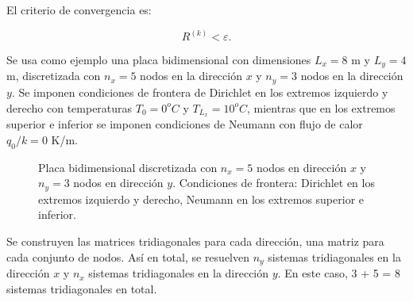 \documentclass[11pt,a4paper]{article}
\begin{document}
El criterio de convergencia es:

\begin{equation}
R^{(k)}<\varepsilon.
\end{equation}

Se usa como ejemplo una placa bidimensional con dimensiones $L_x=8$ m y 
$L_y=4$ m, discretizada con $n_x=5$ nodos en la direcci\'on $x$ y $n_y=3$ nodos 
en la direcci\'on $y$. Se imponen condiciones de frontera de Dirichlet en los
extremos izquierdo y derecho con temperaturas $T_0=0^{o}C$ y $T_{L_x}=10^{o}C$, 
mientras que en los extremos superior e inferior se imponen condiciones de 
Neumann con flujo de calor $q_0/k= 0$ K/m.

\begin{figure}[ht]
\centering
\captionsetup{justification=centering}
\caption{Placa bidimensional discretizada con $n_x=5$ nodos 
en dirección $x$ y $n_y=3$ nodos en dirección $y$. Condiciones de frontera: 
Dirichlet en los extremos izquierdo y derecho, Neumann en los extremos 
superior e inferior.}
\label{fig:placa_2d}
\end{figure}

Se construyen las matrices tridiagonales para cada direcci\'on, una 
matriz para cada conjunto de nodos. As\'i en total, se resuelven $n_y$ 
sistemas tridiagonales en la direcci\'on $x$ y $n_x$ sistemas tridiagonales en 
la direcci\'on $y$. En este caso, 3 + 5 = 8 sistemas tridiagonales en total.
\end{document}
